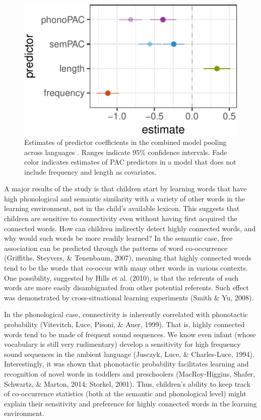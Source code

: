 \documentclass[10pt, letterpaper]{article}
\newenvironment{CodeChunk}{}{}
\begin{document}
\begin{CodeChunk}
\begin{figure}[H]

{\centering \includegraphics{figs/regressions_all_img-1} 

}

\caption{\label{fig:regressions_all_img}Estimates of predictor coefficients in the combined model pooling across languages . Ranges indicate 95\% confidence intervals. Fade color indicates estimates of PAC predictors in a model that does not include frequency and length as covariates.}\label{fig:regressions_all_img}
\end{figure}
\end{CodeChunk}

A major results of the study is that children start by learning words
that have high phonological and semantic similarity with a variety of
other words in the learning environment, not in the child's available
lexicon. This suggests that children are sensitive to connectivity even
without having first acquired the connected words. How can children
indirectly detect highly connected words, and why would such words be
more readily learned? In the semantic case, free association can be
predicted through the patterns of word co-occurrence (Griffiths,
Steyvers, \& Tenenbaum, 2007), meaning that highly connected words tend
to be the words that co-occur with many other words in various contexts.
One possibility, suggested by Hills et al. (2010), is that the referents
of such words are more easily disambiguated from other potential
referents. Such effect was demonstrated by cross-situational learning
experiments (Smith \& Yu, 2008).

In the phonological case, connectivity is inherently correlated with
phonotactic probability (Vitevitch, Luce, Pisoni, \& Auer, 1999). That
is, highly connected words tend to be made of frequent sound sequences.
We know even infant (whose vocabulary is still very rudimentary) develop
a sensitivity for high frequency sound sequences in the ambient language
(Jusczyk, Luce, \& Charles-Luce, 1994). Interestingly, it was shown that
phonotactic probability facilitates learning and recognition of novel
words in toddlers and preschoolers (MacRoy-Higgins, Shafer, Schwartz, \&
Marton, 2014; Storkel, 2001). Thus, children's ability to keep track of
co-occurrence statistics (both at the semantic and phonological level)
might explain their sensitivity and preference for highly connected
words in the learning environment.
\end{document}
